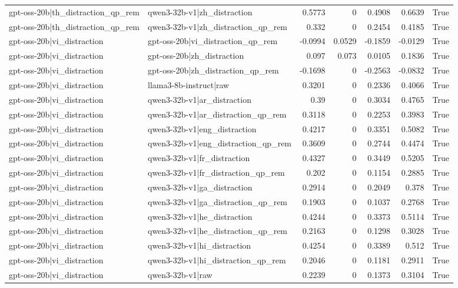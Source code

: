 \begin{table}
\begin{tabular}{l l r r r r l}
gpt-oss-20b|th_distraction_qp_rem & qwen3-32b-v1|zh_distraction & 0.5773 & 0 & 0.4908 & 0.6639 & True \\
gpt-oss-20b|th_distraction_qp_rem & qwen3-32b-v1|zh_distraction_qp_rem & 0.332 & 0 & 0.2454 & 0.4185 & True \\
gpt-oss-20b|vi_distraction & gpt-oss-20b|vi_distraction_qp_rem & -0.0994 & 0.0529 & -0.1859 & -0.0129 & True \\
gpt-oss-20b|vi_distraction & gpt-oss-20b|zh_distraction & 0.097 & 0.073 & 0.0105 & 0.1836 & True \\
gpt-oss-20b|vi_distraction & gpt-oss-20b|zh_distraction_qp_rem & -0.1698 & 0 & -0.2563 & -0.0832 & True \\
gpt-oss-20b|vi_distraction & llama3-8b-instruct|raw & 0.3201 & 0 & 0.2336 & 0.4066 & True \\
gpt-oss-20b|vi_distraction & qwen3-32b-v1|ar_distraction & 0.39 & 0 & 0.3034 & 0.4765 & True \\
gpt-oss-20b|vi_distraction & qwen3-32b-v1|ar_distraction_qp_rem & 0.3118 & 0 & 0.2253 & 0.3983 & True \\
gpt-oss-20b|vi_distraction & qwen3-32b-v1|eng_distraction & 0.4217 & 0 & 0.3351 & 0.5082 & True \\
gpt-oss-20b|vi_distraction & qwen3-32b-v1|eng_distraction_qp_rem & 0.3609 & 0 & 0.2744 & 0.4474 & True \\
gpt-oss-20b|vi_distraction & qwen3-32b-v1|fr_distraction & 0.4327 & 0 & 0.3449 & 0.5205 & True \\
gpt-oss-20b|vi_distraction & qwen3-32b-v1|fr_distraction_qp_rem & 0.202 & 0 & 0.1154 & 0.2885 & True \\
gpt-oss-20b|vi_distraction & qwen3-32b-v1|ga_distraction & 0.2914 & 0 & 0.2049 & 0.378 & True \\
gpt-oss-20b|vi_distraction & qwen3-32b-v1|ga_distraction_qp_rem & 0.1903 & 0 & 0.1037 & 0.2768 & True \\
gpt-oss-20b|vi_distraction & qwen3-32b-v1|he_distraction & 0.4244 & 0 & 0.3373 & 0.5114 & True \\
gpt-oss-20b|vi_distraction & qwen3-32b-v1|he_distraction_qp_rem & 0.2163 & 0 & 0.1298 & 0.3028 & True \\
gpt-oss-20b|vi_distraction & qwen3-32b-v1|hi_distraction & 0.4254 & 0 & 0.3389 & 0.512 & True \\
gpt-oss-20b|vi_distraction & qwen3-32b-v1|hi_distraction_qp_rem & 0.2046 & 0 & 0.1181 & 0.2911 & True \\
gpt-oss-20b|vi_distraction & qwen3-32b-v1|raw & 0.2239 & 0 & 0.1373 & 0.3104 & True \\

\end{tabular}
\end{table}

